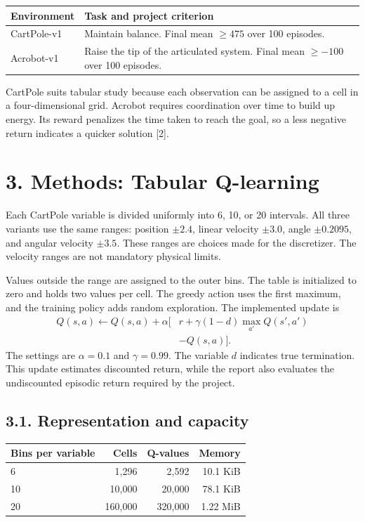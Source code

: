 \documentclass[10pt,a4paper,twocolumn]{extarticle}
\newenvironment{reporttable}
 {\par\noindent\begin{minipage}{\columnwidth}\small\renewcommand{\arraystretch}{1.13}}
 {\end{minipage}\par}
\begin{document}
\begin{reporttable}
\begin{tabularx}{\linewidth}{@{}lX@{}}
\toprule
Environment & Task and project criterion \\
\midrule
CartPole-v1 & Maintain balance. Final mean $\geq475$ over 100 episodes. \\
Acrobot-v1 & Raise the tip of the articulated system. Final mean $\geq-100$ over 100 episodes. \\
\bottomrule
\end{tabularx}
\end{reporttable}

CartPole suits tabular study because each observation can be assigned to a cell in a four-dimensional grid. Acrobot requires coordination over time to build up energy. Its reward penalizes the time taken to reach the goal, so a less negative return indicates a quicker solution [2].

\section*{3. Methods: Tabular Q-learning}
Each CartPole variable is divided uniformly into 6, 10, or 20 intervals. All three variants use the same ranges: position $\pm2.4$, linear velocity $\pm3.0$, angle $\pm0.2095$, and angular velocity $\pm3.5$. These ranges are choices made for the discretizer. The velocity ranges are not mandatory physical limits.

Values outside the range are assigned to the outer bins. The table is initialized to zero and holds two values per cell. The greedy action uses the first maximum, and the training policy adds random exploration. The implemented update is
\begin{align*}
Q(s,a) \gets Q(s,a) + \alpha\big[&r + \gamma(1-d)\max_{a'}Q(s',a')\\
 &- Q(s,a)\big].
\end{align*}
The settings are $\alpha=0.1$ and $\gamma=0.99$. The variable $d$ indicates true termination. This update estimates discounted return, while the report also evaluates the undiscounted episodic return required by the project.

\clearpage
\subsection*{3.1. Representation and capacity}
\begin{reporttable}
\begin{tabularx}{\linewidth}{@{}Xrrr@{}}
\toprule
Bins per variable & Cells & Q-values & Memory \\
\midrule
6  & 1,296   & 2,592   & 10.1 KiB \\
10 & 10,000  & 20,000  & 78.1 KiB \\
20 & 160,000 & 320,000 & 1.22 MiB \\
\bottomrule
\end{tabularx}
\end{reporttable}
\end{document}
